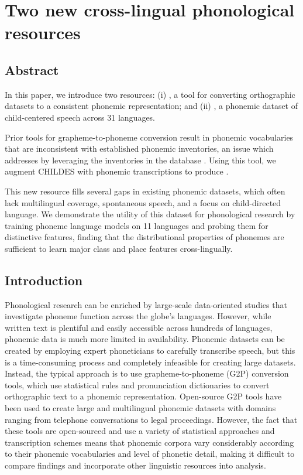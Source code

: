 \chapter{Two new cross-lingual phonological resources}\label{chapter:resources}
\section{Abstract}

In this paper, we introduce two resources: (i) \gpp, a tool for converting orthographic datasets to a consistent phonemic representation; and (ii) \ipachildes, a phonemic dataset of child-centered speech across 31 languages. 

Prior tools for grapheme-to-phoneme conversion result in phonemic vocabularies that are inconsistent with established phonemic inventories, an issue which \gpp addresses by leveraging the inventories in the \phoible database \citep{phoible}. 
Using this tool, we augment CHILDES \citep{macwhinney1985child} with phonemic transcriptions to produce \ipachildes.

This new resource fills several gaps in existing phonemic datasets, which often lack multilingual coverage, spontaneous speech, and a focus on child-directed language.
We demonstrate the utility of this dataset for phonological research by training phoneme language models on 11 languages and probing them for distinctive features, finding that the distributional properties of phonemes are sufficient to learn major class and place features cross-lingually.

\section{Introduction}

Phonological research can be enriched by large-scale data-oriented studies that investigate phoneme function across the globe's languages. However, while written text is plentiful and easily accessible across hundreds of languages, phonemic data is much more limited in availability. Phonemic datasets can be created by employing expert phoneticians to carefully transcribe speech, but this is a time-consuming process and completely infeasible for creating large datasets. Instead, the typical approach is to use grapheme-to-phoneme (G2P) conversion tools, which use statistical rules and pronunciation dictionaries to convert orthographic text to a phonemic representation. Open-source G2P tools have been used to create large and multilingual phonemic datasets with domains ranging from telephone conversations to legal proceedings. However, the fact that these tools are open-sourced and use a variety of statistical approaches and transcription schemes means that phonemic corpora vary considerably according to their phonemic vocabularies and level of phonetic detail, making it difficult to compare findings and incorporate other linguistic resources into analysis.

